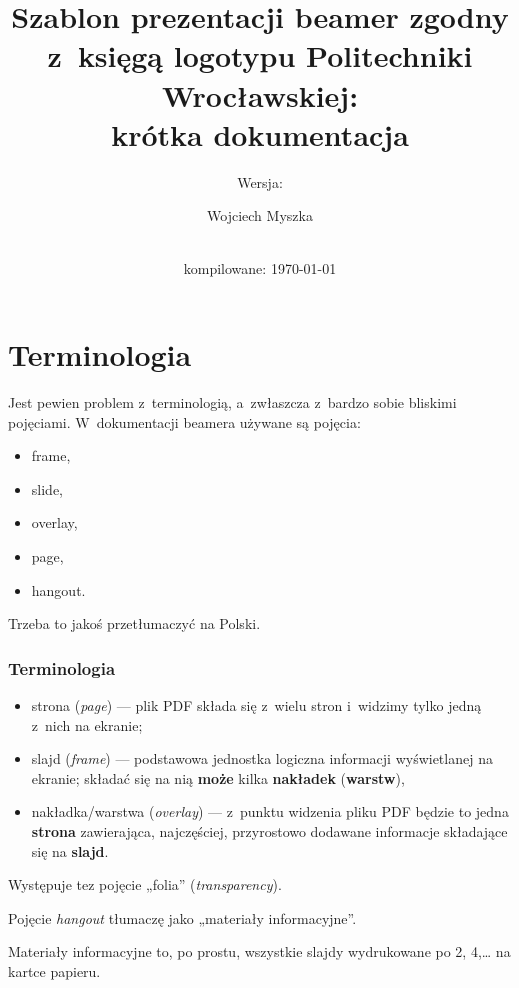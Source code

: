 \documentclass[12pt,aspectratio=169,ignorenonframetext]{beamer}
\title{Szablon prezentacji beamer zgodny\\ z~księgą logotypu Politechniki Wrocławskiej:\\ krótka dokumentacja}
\subtitle{Wersja: \VCRevisionMod}
\author{Wojciech Myszka}
\institute{Katedra Mechaniki i~Inżynierii Materiałowej}
\date{\BZRBuildDate\\ kompilowane: \today}
\begin{document}
\begin{frame}[plain]
 \maketitle
\end{frame}

\ifpdf
 \tableofcontents
\fi

\section{Terminologia}

Jest pewien problem z~terminologią, a~zwłaszcza z~bardzo sobie bliskimi pojęciami. W~dokumentacji beamera używane są pojęcia:
\begin{itemize}
 \item
       frame,
 \item
       slide,
 \item
       overlay,
 \item
       page,
 \item
       hangout.
\end{itemize}
Trzeba to jakoś przetłumaczyć na Polski.

\begin{frame}[fragile]
 \frametitle<presentation>{Terminologia}
 \begin{itemize}
  \item
        strona (\emph{page}) — plik PDF składa się z~wielu stron i~widzimy tylko jedną z~nich na ekranie;
  \item
        slajd (\emph{frame}) — podstawowa jednostka logiczna informacji wyświetlanej na ekranie; składać się na nią \textbf{może} kilka \textbf{nakładek} (\textbf{warstw}),
  \item
        nakładka/warstwa (\emph{overlay}) — z~punktu widzenia pliku PDF będzie to jedna \textbf{strona} zawierająca, najczęściej, przyrostowo dodawane informacje składające się na \textbf{slajd}.

 \end{itemize}
 Występuje tez pojęcie „folia” (\emph{transparency}).

 Pojęcie \emph{hangout} tłumaczę jako „materiały informacyjne”.
\end{frame}
Materiały informacyjne to, po prostu, wszystkie slajdy wydrukowane po 2, 4,… na kartce papieru.
\end{document}
